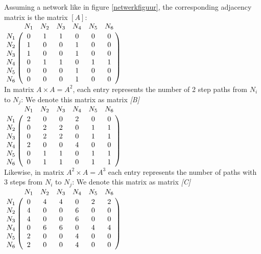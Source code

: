 Assuming a network like in figure \ref{netwerkfiguur}, the corresponding adjacency matrix is the  matrix $[A]$: \\


$
\bordermatrix{
         & N_1		& N_2	& N_3	& N_4 	& N_5	&N_6     \cr
    N_1   & 0		& 1		& 1		& 0		& 0		& 0	     \cr
    N_2   & 1		& 0		& 0		& 1		& 0		& 0	     \cr
    N_3   & 1		& 0		& 0		& 1		& 0		& 0	     \cr
    N_4   & 0		& 1		& 1		& 0		& 1		& 1	     \cr
	N_5   & 0		& 0		& 0		& 1		& 0		& 0	     \cr
	N_6   & 0		& 0		& 0		& 1		& 0		& 0	     \cr
}$
\\

In matrix $A \times A = A^{2}$, each entry represents the number of 2 step paths from $N_{i}$ to $N_{j}$: We denote this matrix as matrix \textit{[B]}\\


$
\bordermatrix{
         & N_1		& N_2	& N_3	& N_4 	& N_5	&N_6     \cr
    N_1   & 2		& 0		& 0		& 2		& 0		& 0	     \cr
    N_2   & 0		& 2		& 2		& 0		& 1		& 1	     \cr
    N_3   & 0		& 2		& 2		& 0		& 1		& 1	     \cr
    N_4   & 2		& 0		& 0		& 4		& 0		& 0	     \cr
	N_5   & 0		& 1		& 1		& 0		& 1		& 1	     \cr
	N_6   & 0		& 1		& 1		& 0		& 1		& 1	     \cr
}$
\\

Likewise, in matrix $A^{2} \times A = A^{3}$ each entry represents the number of paths with 3 steps from $N_{i}$ to $N_{j}$: We denote this matrix as matrix \textit{[C]}\\


$
\bordermatrix{
         & N_1		& N_2	& N_3	& N_4 	& N_5	&N_6     \cr
    N_1   & 0		& 4		& 4		& 0		& 2		& 2	     \cr
    N_2   & 4		& 0		& 0		& 6		& 0		& 0	     \cr
    N_3   & 4		& 0		& 0		& 6		& 0		& 0	     \cr
    N_4   & 0		& 6		& 6		& 0		& 4		& 4	     \cr
	N_5   & 2		& 0		& 0		& 4		& 0		& 0	     \cr
	N_6   & 2		& 0		& 0		& 4		& 0		& 0	     \cr
}$ 


